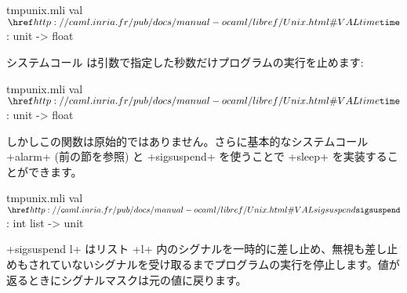 %
\begin{listingcodefile}{tmpunix.mli}
val $\indexlibvalue{Unix}{time}$ : unit -> float
\end{listingcodefile}
%

システムコール  は引数で指定した秒数だけプログラムの実行を止めます:

%
\begin{listingcodefile}{tmpunix.mli}
val $\indexlibvalue{Unix}{time}$ : unit -> float
\end{listingcodefile}
%

しかしこの関数は原始的ではありません。さらに基本的なシステムコール \ml+alarm+ (前の節を参照) と \ml+sigsuspend+ を使うことで \ml+sleep+ を実装することができます。

%
\begin{listingcodefile}{tmpunix.mli}
val $\libvalue{Unix}{sigsuspend}$ : int list -> unit
\end{listingcodefile}
%

\ml+sigsuspend l+ はリスト \ml+l+ 内のシグナルを一時的に差し止め、無視も差し止めもされていないシグナルを受け取るまでプログラムの実行を停止します。値が返るときにシグナルマスクは元の値に戻ります。

